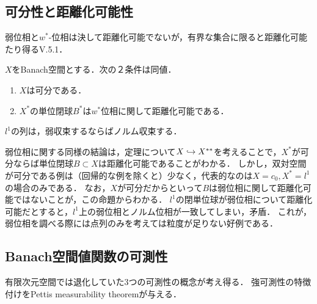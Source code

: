 \documentclass[uplatex,dvipdfmx]{jsreport}
\begin{document}
\subsection{可分性と距離化可能性}

\begin{tcolorbox}[colframe=ForestGreen, colback=ForestGreen!10!white,breakable,colbacktitle=ForestGreen!40!white,coltitle=black,fonttitle=\bfseries\sffamily,
title=]
    弱位相と$w^*$-位相は決して距離化可能でないが，有界な集合に限ると距離化可能たり得る\cite{John Conway}V.5.1．
\end{tcolorbox}

\begin{theorem}[単位閉球の距離化可能性]\label{thm-metrizability-of-ball}
    $X$をBanach空間とする．次の２条件は同値．
    \begin{enumerate}
        \item $X$は可分である．
        \item $X^*$の単位閉球$B^*$は$w^*$位相に関して距離化可能である．
    \end{enumerate}
\end{theorem}

\begin{proposition}[Schur]
    $l^1$の列は，弱収束するならばノルム収束する．
\end{proposition}
\begin{remarks}
    弱位相に関する同様の結論は，定理について$X\hookrightarrow X^{**}$を考えることで，$X^*$が可分ならば単位閉球$B\subset X$は距離化可能であることがわかる．
    しかし，双対空間が可分である例は（回帰的な例を除くと）少なく，代表的なのは$X=c_0,X^*=l^1$の場合のみである．
    なお，$X$が可分だからといって$B$は弱位相に関して距離化可能ではないことが，この命題からわかる．
    $l^1$の閉単位球が弱位相について距離化可能だとすると，$l^1$上の弱位相とノルム位相が一致してしまい，矛盾．
    これが，弱位相を調べる際には点列のみを考えては粒度が足りない好例である．
\end{remarks}

\subsection{Banach空間値関数の可測性}

\begin{tcolorbox}[colframe=ForestGreen, colback=ForestGreen!10!white,breakable,colbacktitle=ForestGreen!40!white,coltitle=black,fonttitle=\bfseries\sffamily,
title=]
    有限次元空間では退化していた3つの可測性の概念が考え得る．
    強可測性の特徴付けをPettis measurability theoremが与える．
\end{tcolorbox}
\end{document}
